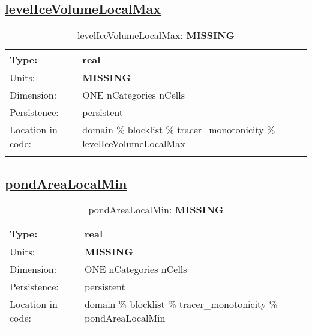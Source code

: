 \subsection[levelIceVolumeLocalMax]{\hyperref[sec:var_tab_tracer_monotonicity]{levelIceVolumeLocalMax}}
\label{subsec:var_sec_tracer_monotonicity_levelIceVolumeLocalMax}
\begin{center}
\begin{longtable}{| p{2.0in} | p{4.0in} |}
        \hline 
        Type: & real \\
        \hline 
        Units: & {\bf \color{red} MISSING} \\
        \hline 
        Dimension: & ONE nCategories nCells \\
        \hline 
        Persistence: & persistent \\
        \hline 
         Location in code: & domain \% blocklist \% tracer\_monotonicity \% levelIceVolumeLocalMax \\
         \hline 
    \caption{levelIceVolumeLocalMax: {\bf \color{red} MISSING}}
\end{longtable}
\end{center}
\subsection[pondAreaLocalMin]{\hyperref[sec:var_tab_tracer_monotonicity]{pondAreaLocalMin}}
\label{subsec:var_sec_tracer_monotonicity_pondAreaLocalMin}
\begin{center}
\begin{longtable}{| p{2.0in} | p{4.0in} |}
        \hline 
        Type: & real \\
        \hline 
        Units: & {\bf \color{red} MISSING} \\
        \hline 
        Dimension: & ONE nCategories nCells \\
        \hline 
        Persistence: & persistent \\
        \hline 
         Location in code: & domain \% blocklist \% tracer\_monotonicity \% pondAreaLocalMin \\
         \hline 
    \caption{pondAreaLocalMin: {\bf \color{red} MISSING}}
\end{longtable}
\end{center}
